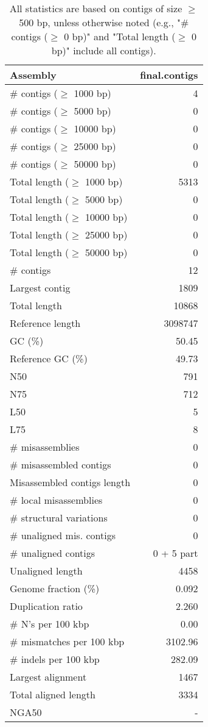 \documentclass[12pt,a4paper]{article}
\begin{document}
\begin{table}[ht]
\begin{center}
\caption{All statistics are based on contigs of size $\geq$ 500 bp, unless otherwise noted (e.g., "\# contigs ($\geq$ 0 bp)" and "Total length ($\geq$ 0 bp)" include all contigs).}
\begin{tabular}{|l*{1}{|r}|}
\hline
Assembly & final.contigs \\ \hline
\# contigs ($\geq$ 1000 bp) & 4 \\ \hline
\# contigs ($\geq$ 5000 bp) & 0 \\ \hline
\# contigs ($\geq$ 10000 bp) & 0 \\ \hline
\# contigs ($\geq$ 25000 bp) & 0 \\ \hline
\# contigs ($\geq$ 50000 bp) & 0 \\ \hline
Total length ($\geq$ 1000 bp) & 5313 \\ \hline
Total length ($\geq$ 5000 bp) & 0 \\ \hline
Total length ($\geq$ 10000 bp) & 0 \\ \hline
Total length ($\geq$ 25000 bp) & 0 \\ \hline
Total length ($\geq$ 50000 bp) & 0 \\ \hline
\# contigs & 12 \\ \hline
Largest contig & 1809 \\ \hline
Total length & 10868 \\ \hline
Reference length & 3098747 \\ \hline
GC (\%) & 50.45 \\ \hline
Reference GC (\%) & 49.73 \\ \hline
N50 & 791 \\ \hline
N75 & 712 \\ \hline
L50 & 5 \\ \hline
L75 & 8 \\ \hline
\# misassemblies & 0 \\ \hline
\# misassembled contigs & 0 \\ \hline
Misassembled contigs length & 0 \\ \hline
\# local misassemblies & 0 \\ \hline
\# structural variations & 0 \\ \hline
\# unaligned mis. contigs & 0 \\ \hline
\# unaligned contigs & 0 + 5 part \\ \hline
Unaligned length & 4458 \\ \hline
Genome fraction (\%) & 0.092 \\ \hline
Duplication ratio & 2.260 \\ \hline
\# N's per 100 kbp & 0.00 \\ \hline
\# mismatches per 100 kbp & 3102.96 \\ \hline
\# indels per 100 kbp & 282.09 \\ \hline
Largest alignment & 1467 \\ \hline
Total aligned length & 3334 \\ \hline
NGA50 & - \\ \hline
\end{tabular}
\end{center}
\end{table}
\end{document}
